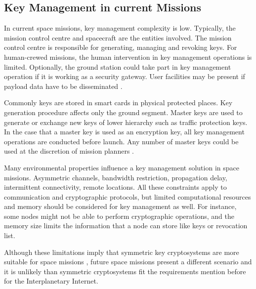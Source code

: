  



\subsection{Key Management in current Missions}

In current space missions, key management complexity is low.  Typically, the mission control centre and spacecraft are the entities involved. The mission control centre is responsible for generating, managing and revoking keys. For human-crewed missions, the human intervention in key management operations is limited. Optionally, the ground station could take part in key management operation if it is working as a security gateway.  User facilities may be present if payload data have to be disseminated \cite{book2011space}. 


Commonly keys are stored in smart cards in physical protected places. Key generation procedure affects only the ground segment. Master keys are used to generate or exchange new keys of lower hierarchy such as traffic protection keys. In the case that a master key is used as an encryption key, all key management operations are conducted before launch. Any number of master keys could be used at the discretion of mission planners \cite{book2011space}.

Many environmental properties influence a key management solution in space missions. Asymmetric channels, bandwidth restriction, propagation delay, intermittent connectivity, remote locations. All these constraints apply to communication and cryptographic protocols, but limited computational resources and memory should be considered for key management as well. For instance, some nodes might not be able to perform cryptographic operations, and the memory size limits the information that a node can store like keys or revocation list.

Although these limitations imply that symmetric key cryptosystems are more suitable for space missions \cite{book2011space}, future space missions present a different scenario and it is unlikely than symmetric cryptosystems fit the requirements mention before for the Interplanetary Internet.


